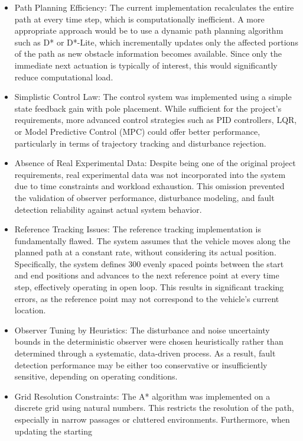 \documentclass[12pt]{article}
\begin{document}
\begin{itemize}
    \item Path Planning Efficiency:
The current implementation recalculates the entire path at every time step, which is computationally inefficient. 
A more appropriate approach would be to use a dynamic path planning algorithm such as D* or D*-Lite, which incrementally 
updates only the affected portions of the path as new obstacle information becomes available. Since only the immediate 
next actuation is typically of interest, this would significantly reduce computational load.
    \item Simplistic Control Law:
The control system was implemented using a simple state feedback gain with pole placement. While sufficient for the 
project's requirements, more advanced control strategies such as PID controllers, LQR, or Model Predictive Control 
(MPC) could offer better performance, particularly in terms of trajectory tracking and disturbance rejection.
    \item Absence of Real Experimental Data:
Despite being one of the original project requirements, real experimental data was not incorporated into the 
system due to time constraints and workload exhaustion. This omission prevented the validation of observer 
performance, disturbance modeling, and fault detection reliability against actual system behavior.
    \item Reference Tracking Issues:
The reference tracking implementation is fundamentally flawed. The system assumes that the vehicle moves 
along the planned path at a constant rate, without considering its actual position. Specifically, the system 
defines 300 evenly spaced points between the start and end positions and advances to the next reference point 
at every time step, effectively operating in open loop. This results in significant tracking errors, as the 
reference point may not correspond to the vehicle's current location.
    \item Observer Tuning by Heuristics:
The disturbance and noise uncertainty bounds in the deterministic observer were chosen heuristically rather 
than determined through a systematic, data-driven process. As a result, fault detection performance may be 
either too conservative or insufficiently sensitive, depending on operating conditions.
    \item Grid Resolution Constraints:
The A* algorithm was implemented on a discrete grid using natural numbers. This restricts the resolution of 
the path, especially in narrow passages or cluttered environments. Furthermore, when updating the starting 

\end{itemize}
\end{document}
